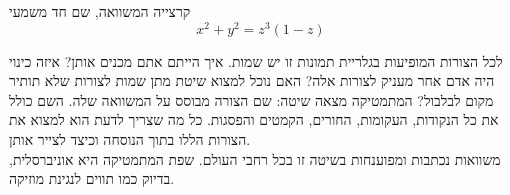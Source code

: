 \begin{surferPage}{קרצייה}
המשוואה, שם חד משמעי \\
\smallskip
\[x^2 + y^2	= z^3	(1 - z) \]


\singlespacing
לכל הצורות המופיעות בגלריית תמונות זו יש שמות. איך הייתם אתם מכנים אותן? איזה כינוי היה אדם אחר מעניק לצורות אלה?
\vspace{0,3cm}
האם נוכל למצוא שיטת מתן שמות לצורות שלא תותיר מקום לבלבול? המתמטיקה מצאה שיטה: שם הצורה מבוסס על המשוואה שלה. השם כולל את כל הנקודות, העקומות, החורים, הקמטים והפסגות. כל מה שצריך לדעת הוא למצוא את הצורות הללו בתוך הנוסחה וכיצד לצייר אותן.\\
\vspace{0,3cm}
משוואות נכתבות ומפוענחות בשיטה זו בכל רחבי העולם. שפת המתמטיקה היא אוניברסלית, בדיוק כמו תווים לנגינת מוזיקה.
\end{surferPage}
